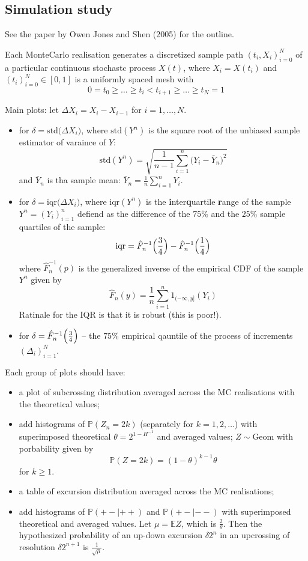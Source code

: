 \documentclass[a4paper]{report}
\newcommand{\pr}{\mathbb{P}}
\newcommand{\ex}{\mathbb{E}}
\begin{document}

\subsection{Simulation study} %
\label{sub:simulation_study_fbm}

See the paper by Owen Jones and Shen (2005) for the outline.

Each MonteCarlo realisation generates a discretized sample path $(t_i, X_i)_{i=0}^N$ of
a particular continuous stochastc process $X(t)$, where $X_i = X(t_i)$ and $(t_i)_{i=0}^N\in [0,1]$
is a uniformly spaced mesh with
\[0 = t_0 \geq \ldots \geq t_i < t_{i+1} \geq \ldots \geq t_N = 1\]

Main plots: let $\Delta X_i = X_i - X_{i-1}$ for $i=1,\ldots, N$.
\begin{itemize}
	\item for $\delta = \text{std}\bigl(\Delta X_i \bigr)$, where $\text{std}(Y^n)$ is
	the square root of the unbiased sample estimator of varaince of $Y$:
	\[ \text{std}(Y^n) = \sqrt{ \frac{1}{n-1} \sum_{i=1}^n \bigl( Y_i - \bar{Y}_n \bigr)^2 }\]
	and $\bar{Y}_n$ is tha sample mean: $\bar{Y}_n = \frac{1}{n}\sum_{i=1}^n Y_i$. 

	\item for $\delta = \text{iqr}\bigl(\Delta X_i \bigr)$, where $\text{iqr}(Y^n)$ is
	the \textbf{i}nter\textbf{q}uartile \textbf{r}ange of the sample $Y^n = (Y_i)_{i=1}^n$
	defiend as the difference of the $75\%$ and the $25\%$ sample quartiles of the sample:
	\[\text{iqr} = \hat{F}^{-1}_n\Bigl(\frac{3}{4}\Bigr) - \hat{F}^{-1}_n\Bigl(\frac{1}{4}\Bigr)\]
	where $\hat{F}^{-1}_n(p)$ is the generalized inverse of the empirical CDF of the sample $Y^n$
	given by
	\[\hat{F}_n(y) = \frac{1}{n} \sum_{i=1}^n 1_{(-\infty,y]}(Y_i)\]
	Ratinale for the IQR is that it is robust (this is poor!).
	\item for $\delta = \hat{F}^{-1}_n\Bigl(\frac{3}{4}\Bigr)$ -- the $75\%$ empirical qauntile of
	the process of increments $(\Delta_i)_{i=1}^N$.
\end{itemize}

Each group of plots should have: \begin{itemize}
	\item a plot of subcrossing distribution averaged across the MC realisations with
	the theoretical values;
	\item add histograms of $\pr(Z_n = 2k)$ (separately for $k=1,2,\ldots$) with
	superimposed theoretical $\theta = 2^{1-H^{-1}}$ and averaged values;
	$Z\sim\text{Geom}$ with porbability given by
	\[\pr(Z = 2k) = (1-\theta)^{k-1} \theta\]
	for $k\geq 1$.
	\item a table of excursion distribution averaged across the MC realisations;
	\item add histograms of $\pr(+-|++)$ and $\pr(+-|--)$ with superimposed theoretical
	and averaged values. Let $\mu = \ex Z$, which is $\frac{2}{\theta}$. Then the
	hypothesized probability of an up-down excursion $\delta 2^n$ in an upcrossing
	of resolution $\delta 2^{n+1}$ is $\frac{1}{\sqrt{\mu}}$.
\end{itemize}
\end{document}
